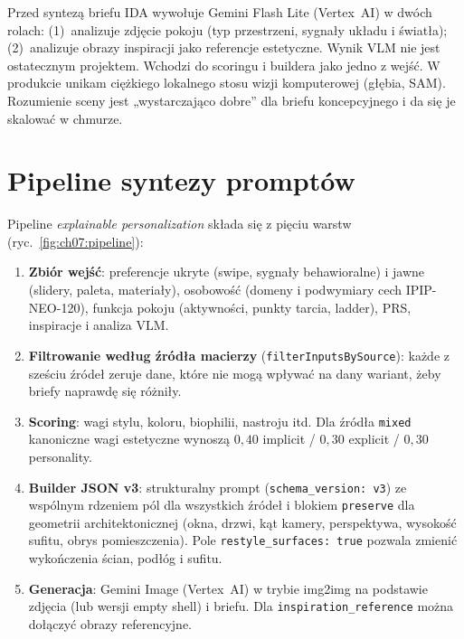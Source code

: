 Przed syntezą briefu IDA wywołuje Gemini Flash Lite (Vertex~AI) w dwóch rolach: (1)~analizuje zdjęcie pokoju (typ przestrzeni, sygnały układu i światła); (2)~analizuje obrazy inspiracji jako referencje estetyczne. Wynik VLM nie jest ostatecznym projektem. Wchodzi do scoringu i buildera jako jedno z wejść.
W produkcie unikam ciężkiego lokalnego stosu wizji komputerowej (głębia, SAM). Rozumienie sceny jest „wystarczająco dobre” dla briefu koncepcyjnego i da się je skalować w chmurze.

\section{Pipeline syntezy promptów}
\label{ch07:sec:pipeline}

Pipeline \emph{explainable personalization} składa się z pięciu warstw (ryc.~\ref{fig:ch07:pipeline}):

\begin{enumerate}
  \item \textbf{Zbiór wejść}: preferencje ukryte (swipe, sygnały behawioralne) i jawne (slidery, paleta, materiały), osobowość (domeny i podwymiary cech IPIP-NEO-120), funkcja pokoju (aktywności, punkty tarcia, ladder), PRS, inspiracje i analiza VLM.
  \item \textbf{Filtrowanie według źródła macierzy} (\texttt{filterInputsBySource}): każde z sześciu źródeł zeruje dane, które nie mogą wpływać na dany wariant, żeby briefy naprawdę się różniły.
  \item \textbf{Scoring}: wagi stylu, koloru, biophilii, nastroju itd. Dla źródła \texttt{mixed} kanoniczne wagi estetyczne wynoszą $0{,}40$ implicit / $0{,}30$ explicit / $0{,}30$ personality.
  \item \textbf{Builder JSON v3}: strukturalny prompt (\texttt{schema\_version: v3}) ze wspólnym rdzeniem pól dla wszystkich źródeł i blokiem \texttt{preserve} dla geometrii architektonicznej (okna, drzwi, kąt kamery, perspektywa, wysokość sufitu, obrys pomieszczenia). Pole \texttt{restyle\_surfaces: true} pozwala zmienić wykończenia ścian, podłóg i sufitu.
  \item \textbf{Generacja}: Gemini Image (Vertex~AI) w trybie img2img na podstawie zdjęcia (lub wersji empty shell) i briefu. Dla \texttt{inspiration\_reference} można dołączyć obrazy referencyjne.
\end{enumerate}

